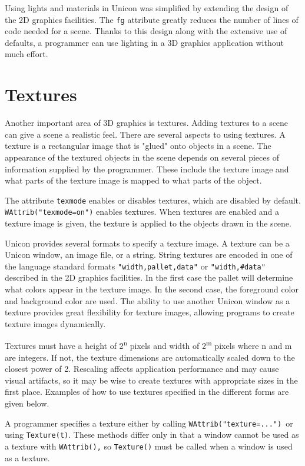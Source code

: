 Using lights and materials in Unicon was simplified by extending the
design of the 2D graphics facilities. The \texttt{fg} attribute
greatly reduces the number of lines of code needed for a scene. Thanks
to this design along with the extensive use of defaults, a programmer
can use lighting in a 3D graphics application without much effort.

\section{Textures}

Another important area of 3D graphics is textures.  Adding textures to
a scene can give a scene a realistic feel.  There are several aspects
to using textures. A texture is a rectangular image that is "glued"
onto objects in a scene. The appearance of the textured objects in the
scene depends on several pieces of information supplied by the
programmer. These include the texture image and what parts of the
texture image is mapped to what parts of the object.

The attribute \texttt{texmode} enables or disables textures, which are
disabled by default.  \texttt{WAttrib("texmode=on")} enables textures.
When textures are enabled and a texture image is given, the texture is
applied to the objects drawn in the scene.

Unicon provides several formats to specify a texture image. A texture
can be a Unicon window, an image file, or a string. String textures
are encoded in one of the language standard formats
\texttt{"width,pallet,data"} or \texttt{"width,\#data"} described in
the 2D graphics facilities. In the first case the pallet will
determine what colors appear in the texture image. In the second case,
the foreground color and background color are used. The ability to use
another Unicon window as a texture provides great flexibility for
texture images, allowing programs to create texture images
dynamically.

Textures must have a height of 2\textsuperscript{n} pixels and width
of 2\textsuperscript{m} pixels where n and m are integers. If not, the
texture dimensions are automatically scaled down to the closest power
of 2. Rescaling affects application performance and may cause visual
artifacts, so it may be wise to create textures with appropriate sizes
in the first place. Examples of how to use textures specified in the
different forms are given below.

A programmer specifies a texture either by calling
\texttt{WAttrib("texture=...")}\texttt{ }or using
\texttt{Texture(t)}. These methods differ only in that a window cannot
be used as a texture with \texttt{WAttrib(),} so \texttt{Texture()}
must be called when a window is used as a texture.

